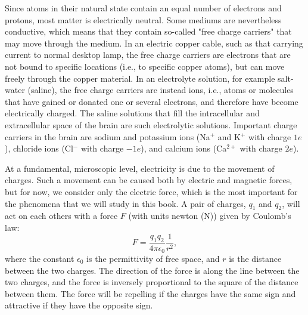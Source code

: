 Since atoms in their natural state contain an equal number of electrons and protons, most matter is electrically neutral. Some mediums are nevertheless conductive, which means that they contain so-called "free charge carriers" that may move through the medium. In an electric copper cable, such as that carrying current to normal desktop lamp, the free charge carriers are electrons that are not bound to specific locations (i.e., to specific copper atoms), but can move freely through the copper material. In an electrolyte solution, for example salt-water (saline), the free charge carriers are instead ions, i.e., atoms or molecules that have gained or donated one or several electrons, and therefore have become electrically charged. The saline solutions that fill the intracellular and extracellular space of the brain are such electrolytic solutions. Important charge carriers in the brain are sodium and potassium ions (Na$^+$ and K$^+$ with charge $1e$), chloride ions (Cl$^-$ with charge $-1e$), and calcium ions (Ca$^{2+}$ with charge $2e$).

At a fundamental, microscopic level, electricity is due to the movement of charges. Such a movement can be caused both by electric and magnetic forces, but for now, we consider only the electric force, which is the most important for the phenomena that we will study in this book. A pair of charges, $q_1$ and $q_2$, will act on each others with a force $F$ (with units newton (\si{\newton})) given by Coulomb's law:
\begin{equation}
F = \frac{q_1q_2}{4\pi \epsilon_0} \frac{1}{r^2},
\label{eq:Basics:CoulombF}
\end{equation}
where the constant $\epsilon_0$ is the permittivity of free space, and $r$ is the distance between the two charges. The direction of the force is along the line between the two charges, and the force is inversely proportional to the square of the distance between them. The force will be repelling if the charges have the same sign and attractive if they have the opposite sign. 

